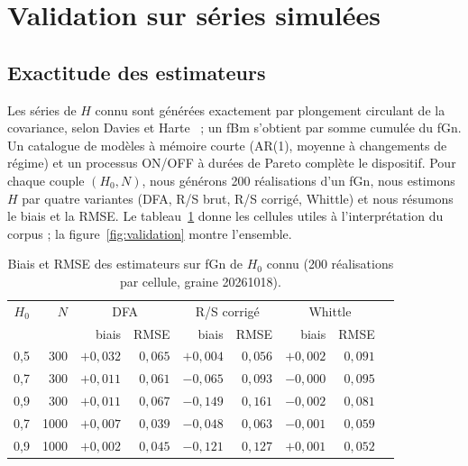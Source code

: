 \documentclass[11pt,a4paper]{article}
\renewcommand{\_}{\textunderscore\penalty0\hspace{0pt}}
\begin{document}
\section{Validation sur séries simulées}
\label{sec:valid}

\subsection{Exactitude des estimateurs}
\label{sec:exactitude}

Les séries de $H$ connu sont générées exactement par plongement circulant de la covariance,
selon Davies et Harte~\cite{davies1987} ; un fBm s'obtient par somme cumulée du fGn. Un
catalogue de modèles à mémoire courte (AR(1), moyenne à changements de régime) et un
processus ON/OFF à durées de Pareto complète le dispositif. Pour chaque couple $(H_0,N)$,
nous générons 200 réalisations d'un fGn, nous estimons $H$ par quatre variantes (DFA, R/S
brut, R/S corrigé, Whittle) et nous résumons le biais et la RMSE. Le
tableau~\ref{tab:exactitude} donne les cellules utiles à l'interprétation du corpus ; la
figure~\ref{fig:validation} montre l'ensemble.

\begin{table}[ht]
\centering
\caption{Biais et RMSE des estimateurs sur fGn de $H_0$ connu (200 réalisations par cellule, graine 20261018).}
\label{tab:exactitude}
\small
\begin{tabular}{rrrrrrrrr}
\toprule
$H_0$ & $N$ & \multicolumn{2}{c}{DFA} & \multicolumn{2}{c}{R/S corrigé} & \multicolumn{2}{c}{Whittle} \\
 & & biais & RMSE & biais & RMSE & biais & RMSE \\
\midrule
0{,}5 & 300 & $+0{,}032$ & $0{,}065$ & $+0{,}004$ & $0{,}056$ & $+0{,}002$ & $0{,}091$ \\
0{,}7 & 300 & $+0{,}011$ & $0{,}061$ & $-0{,}065$ & $0{,}093$ & $-0{,}000$ & $0{,}095$ \\
0{,}9 & 300 & $+0{,}011$ & $0{,}067$ & $-0{,}149$ & $0{,}161$ & $-0{,}002$ & $0{,}081$ \\
0{,}7 & 1000 & $+0{,}007$ & $0{,}039$ & $-0{,}048$ & $0{,}063$ & $-0{,}001$ & $0{,}059$ \\
0{,}9 & 1000 & $+0{,}002$ & $0{,}045$ & $-0{,}121$ & $0{,}127$ & $+0{,}001$ & $0{,}052$ \\
\bottomrule
\end{tabular}
\end{table}
\end{document}
